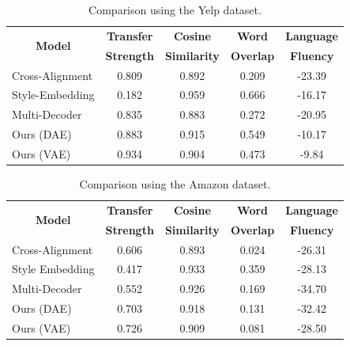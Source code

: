\documentclass[letterpaper]{article} %
\newcommand{\tabh}[1]{\multicolumn{1}{c|}{\textbf{#1}}}
\newcommand{\tabc}[2]{\multicolumn{1}{|c||}{\multirow{#1}{*}{\textbf{#2}}}}
\begin{document}
\begin{table}[ht]
	\centering
	\begin{tabular}{| l || c | c | c | c |}
		\hline
		\tabc{2}{Model}                            & \tabh{Transfer} & \tabh{Cosine}     & \tabh{Word}    & \tabh{Language} \\
		                                           & \tabh{Strength} & \tabh{Similarity} & \tabh{Overlap} & \tabh{Fluency}  \\
		\hline
		\hline
		Cross-Alignment \cite{shen2017style}       & 0.809           & 0.892             & 0.209          & -23.39          \\
		\hline
		Style-Embedding \cite{fu2017style}         & 0.182           & 0.959             & 0.666          & -16.17          \\
		\hline
		Multi-Decoder \cite{zhao2018adversarially} & 0.835           & 0.883             & 0.272          & -20.95          \\
		\hline
		Ours (DAE)                                 & 0.883           & 0.915             & 0.549          & -10.17          \\
		\hline
		Ours (VAE)                                 & 0.934           & 0.904             & 0.473          & -9.84           \\
		\hline
	\end{tabular}
	\caption{Comparison using the Yelp dataset.}
	\label{tab:yelp-comparison-previous}
\end{table}

\begin{table}[ht]
	\centering
	\begin{tabular}{| l || c | c | c | c |}
		\hline
		\tabc{2}{Model}                            & \tabh{Transfer} & \tabh{Cosine}     & \tabh{Word}    & \tabh{Language} \\
		                                           & \tabh{Strength} & \tabh{Similarity} & \tabh{Overlap} & \tabh{Fluency}  \\
		\hline
		\hline
		Cross-Alignment \cite{shen2017style}       & 0.606           & 0.893             & 0.024          & -26.31          \\
		\hline
		Style Embedding \cite{fu2017style}         & 0.417           & 0.933             & 0.359          & -28.13          \\
		\hline
		Multi-Decoder \cite{zhao2018adversarially} & 0.552           & 0.926             & 0.169          & -34.70          \\
		\hline
		Ours (DAE)                                 & 0.703           & 0.918             & 0.131          & -32.42          \\
		\hline
		Ours (VAE)                                 & 0.726           & 0.909             & 0.081          & -28.50          \\
		\hline
	\end{tabular}
	\caption{Comparison using the Amazon dataset.}
	\label{tab:amazon-comparison-previous}
\end{table}
\end{document}
